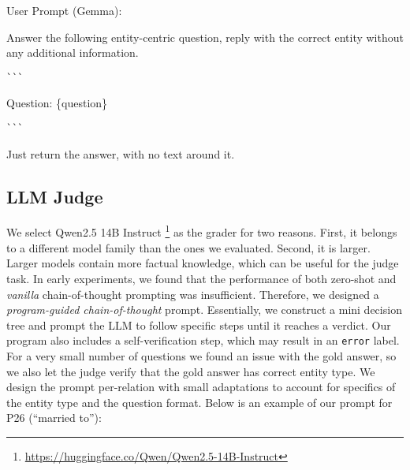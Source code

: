 User Prompt (Gemma):
\begin{mdframed}[backgroundcolor=blue!5, skipabove=0.5\baselineskip]
\small

Answer the following entity-centric question, reply with the correct entity without any additional information.

\verb|```|

Question: \{question\}

\verb|```|

Just return the answer, with no text around it.
\end{mdframed}
\vspace{0.5\baselineskip}







\subsection{LLM Judge}
\label{sec:llm_judge}


We select {\textsf{Qwen2.5 14B Instruct}} \citep{yang2024qwen2}\footnote{\scriptsize \url{https://huggingface.co/Qwen/Qwen2.5-14B-Instruct}} as the grader for two reasons. First, it belongs to a different model family than the ones we evaluated. Second, it is larger. Larger models contain more factual knowledge, which can be useful for the judge task. In early experiments, we found that the performance of both zero-shot and \emph{vanilla} chain-of-thought prompting was insufficient. Therefore, we designed a \emph{program-guided chain-of-thought} prompt. Essentially, we construct a mini decision tree and prompt the LLM to follow specific steps until it reaches a verdict. Our program also includes a self-verification step, which may result in an {\texttt{error}} label. For a very small number of questions we found an issue with the gold answer, so we also let the judge verify that the gold answer has correct entity type. 
We design the prompt per-relation with small adaptations to account for specifics of the entity type and the question format. Below is an example of our prompt for P26 (``married to''):




